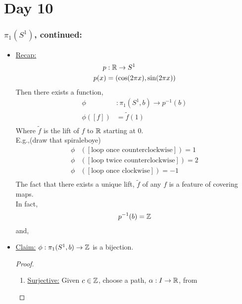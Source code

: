 \section{Day 10}
    \subsubsection{$\pi_1(S^1)$, continued:}
    \begin{itemize}
        \item \underline{Recap:}
            \begin{align*}
                p&: \mathbb{R} \rightarrow S^{1}\\
                p(x)&=(\cos(2\pi x), \sin(2\pi x))\\
            \end{align*}
            Then there exists a function,
            \begin{align*}
                \phi &: \pi_1(S^{1}, b)\rightarrow p^{-1}(b)\\
                \phi([f])&=\tilde{f}(1)\\
            \end{align*}
            Where $\tilde{f}$ is the lift of $f$ to $\mathbb{R}$ starting at $0$.\\
            E.g.,(draw that spiraleboye)
            \begin{align*}
                \phi&([\text{loop once counterclockwise}])=1\\
                \phi&([\text{loop twice counterclockwise}])=2\\
                \phi&([\text{loop once clockwise}])=-1\\
            \end{align*}
            The fact that there exists a unique lift, $\tilde{f}$ of any $f$ is a feature
            of covering maps.\\
            In fact,
            \begin{align*}
                p^{-1}(b)=\mathbb{Z}\\
            \end{align*}
            and,\\
        \item \underline{Claim:} $\phi: \pi_1(S^1, b)\rightarrow \mathbb{Z}$ is a bijection.
            \begin{proof}
                \begin{enumerate}
                    \item \underline{Surjective:} Given $c\in\mathbb{Z}$, choose a path, $\alpha: I \rightarrow \mathbb{R}$, from

\end{enumerate}
\end{proof}
\end{itemize}
